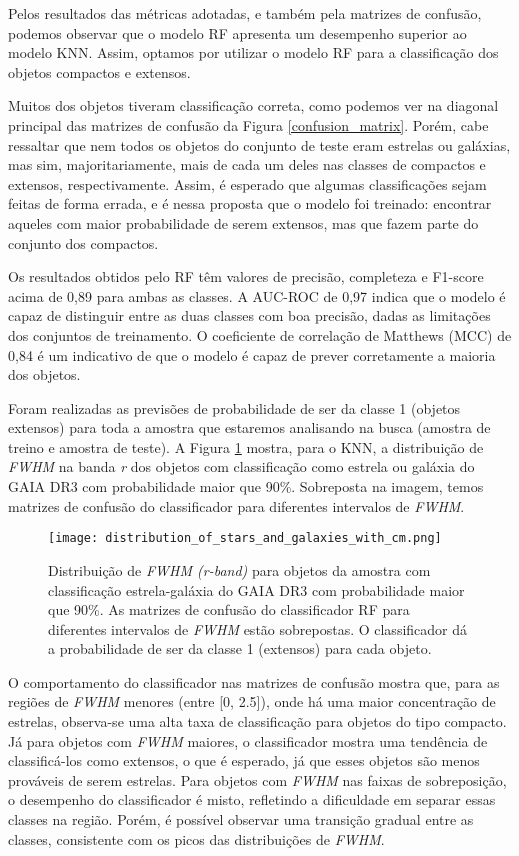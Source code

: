 Pelos resultados das métricas adotadas, e também pela matrizes de confusão, podemos observar que o modelo RF apresenta um desempenho superior ao modelo KNN. Assim, optamos por utilizar o modelo RF para a classificação dos objetos compactos e extensos.

Muitos dos objetos tiveram classificação correta, como podemos ver na diagonal principal das matrizes de confusão da Figura \ref{confusion_matrix}. Porém, cabe ressaltar que nem todos os objetos do conjunto de teste eram estrelas ou galáxias, mas sim, majoritariamente, mais de cada um deles nas classes de compactos e extensos, respectivamente. Assim, é esperado que algumas classificações sejam feitas de forma errada, e é nessa proposta que o modelo foi treinado: encontrar aqueles com maior probabilidade de serem extensos, mas que fazem parte do conjunto dos compactos.

Os resultados obtidos pelo RF têm valores de precisão, completeza e F1-score acima de 0,89 para ambas as classes. A AUC-ROC de 0,97 indica que o modelo é capaz de distinguir entre as duas classes com boa precisão, dadas as limitações dos conjuntos de treinamento. O coeficiente de correlação de Matthews (MCC) de 0,84 é um indicativo de que o modelo é capaz de prever corretamente a maioria dos objetos.

Foram realizadas as previsões de probabilidade de ser da classe 1 (objetos extensos) para toda a amostra que estaremos analisando na busca (amostra de treino e amostra de teste). A Figura \ref{probabilidade_extensos_fwhm} mostra, para o KNN, a distribuição de \textit{FWHM} na banda \textit{r} dos objetos com classificação como estrela ou galáxia do GAIA DR3 com probabilidade maior que 90\%. Sobreposta na imagem, temos matrizes de confusão do classificador para diferentes intervalos de \textit{FWHM}.

\begin{figure}[!ht]
    \centering
    \texttt{[image: distribution\_of\_stars\_and\_galaxies\_with\_cm.png]}
    \caption[]{Distribuição de \textit{FWHM (r-band)} para objetos da amostra com classificação estrela-galáxia do GAIA DR3 com probabilidade maior que 90\%. As matrizes de confusão do classificador RF para diferentes intervalos de \textit{FWHM} estão sobrepostas. O classificador dá a probabilidade de ser da classe 1 (extensos) para cada objeto. }
    \label{probabilidade_extensos_fwhm}
\end{figure}

O comportamento do classificador nas matrizes de confusão mostra que, para as regiões de \textit{FWHM} menores (entre [0, 2.5]), onde há uma maior concentração de estrelas, observa-se uma alta taxa de classificação para objetos do tipo compacto. Já para objetos com \textit{FWHM} maiores, o classificador mostra uma tendência de classificá-los como extensos, o que é esperado, já que esses objetos são menos prováveis de serem estrelas. Para objetos com \textit{FWHM} nas faixas de sobreposição, o desempenho do classificador é misto, refletindo a dificuldade em separar essas classes na região. Porém, é possível observar uma transição gradual entre as classes, consistente com os picos das distribuições de \textit{FWHM}.

